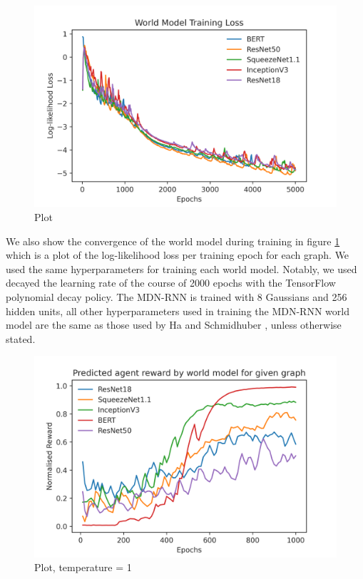 \begin{figure}[ht]
  \centering
  \includegraphics[width=1\columnwidth]{sections/5evaluation/images/mb_training_loss.png}
  \caption[Log-likelihood loss of world models]{Plot}
  \label{fig:eval:world-model-loss}
\end{figure}

We also show the convergence of the world model during training in figure \ref{fig:eval:world-model-loss} which is a plot of the log-likelihood loss per training epoch for each graph. We used the same hyperparameters for training each world model. Notably, we used decayed the learning rate of the course of 2000 epochs with the TensorFlow polynomial decay policy. The MDN-RNN is trained with 8 Gaussians and 256 hidden units, all other hyperparameters used in training the MDN-RNN world model are the same as those used by Ha and Schmidhuber \cite{ha2018worldmodels}, unless otherwise stated.

\begin{figure}[ht]
  \centering
  \includegraphics[width=1\columnwidth]{sections/5evaluation/images/mb_ctrl_training_reward.png}
  \caption[Predicted epoch reward during training of agent in world model]{Plot, temperature = 1}
  \label{fig:eval:world-model-pred-reward}
\end{figure}

